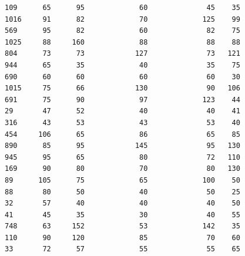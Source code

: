\documentclass[
  12pt,
]{extreport}
\begin{document}
\begin{itemize}
\begin{verbatim}
109      65      95             60              45    35
1016     91      82             70             125    99
569      95      82             60              82    75
1025     88     160             88              88    88
804      73      73            127              73   121
944      65      35             40              35    75
690      60      60             60              60    30
1015     75      66            130              90   106
691      75      90             97             123    44
29       47      52             40              40    41
316      43      53             43              53    40
454     106      65             86              65    85
890      85      95            145              95   130
945      95      65             80              72   110
169      90      80             70              80   130
89      105      75             65             100    50
88       80      50             40              50    25
32       57      40             40              40    50
41       45      35             30              40    55
748      63     152             53             142    35
110      90     120             85              70    60
33       72      57             55              55    65
\end{verbatim}
\end{itemize}
\end{document}
